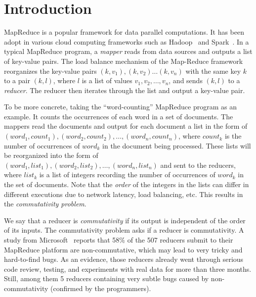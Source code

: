 
\section{Introduction}
MapReduce is a  popular framework for data parallel computations. It has been adopt in various cloud computing frameworks such as Hadoop~\cite{Hadoop} and Spark~\cite{Spark}. In a typical MapReduce program, a \emph{mapper} reads from data sources and outputs a list of key-value pairs. 
The load balance mechanism of the Map-Reduce framework reorganizes the key-value pairs $(k, v_1), (k,v_2)\ldots(k,v_n)$ with the same key $k$ to a pair $(k,l)$, where $l$ is a list of values $v_1,v_2,\ldots,v_n$, and sends $(k,l)$ to a \emph{reducer}. The reducer then iterates through the list and output a key-value pair.

To be more concrete, taking the ``word-counting'' MapReduce program as an example. It counts the occurrences of each word in a set of documents. The mappers read the documents and output for each document a list in the form of $(word_1, count_1), (word_2, count_2), \ldots, (word_n, count_n)$, where $count_k$ is the number of occurrences of $word_k$ in the document being processed. These lists will be reorganized into the form of $(word_1, list_1), (word_2,list_2), \ldots, (word_n,list_n)$ and sent to the reducers, where $list_k$ is a list of integers recording the number of occurrences of $word_k$ in the set of documents. Note that the \emph{order} of the integers in the lists can differ in different executions due to network latency, load balancing, etc. This results in the \emph{commutativity problem}.

We say that a reducer is \emph{commutativity} if its output is independent of the order of its inputs. The commutativity problem asks if a reducer is commutativity. A study from Microsoft~\cite{XZZ+14} reports that 58\% of the 507 reducers submit to their MapReduce platform are non-commutative, which may lead to very tricky and hard-to-find bugs.
As an evidence, those reducers already went through serious code review, testing, and experiments with real data for more than three months. Still, among them 5 reducers containing very subtle bugs caused by non-commutativity (confirmed by the programmers). 

